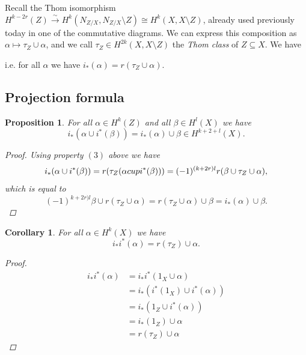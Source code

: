 \documentclass[A4paper, british]{amsart}
\theoremstyle{darkgreentheorem}
\newtheorem{prop}[thm]{Proposition}
\newtheorem{cor}[thm]{Corollary}
\theoremstyle{darkbluedefinition}
\theoremstyle{darkredexample}
\theoremstyle{remark}
\newcommand{\1}{\mathbbm{1}}
\newcommand{\sub}{\subseteq}
\begin{document}
Recall the Thom isomorphism $H^{k-2r}(Z)\xrightarrow{\sim}H^{k}(N_{Z/X},N_{Z/X}\setminus Z)\cong H^{k}(X,X\setminus Z)$, already used previously today in one of the commutative diagrams.
We can express this composition as $\alpha\mapsto \tau_{Z}\cup \alpha$, and we call $\tau_{Z}\in H^{2k}(X,X\setminus Z)$ the \textit{Thom class} of $Z\sub X$.
We have
\begin{center}
\end{center}
i.e. for all $\alpha$ we have $i_{*}(\alpha)=r(\tau_{Z}\cup \alpha)$.

\subsection{Projection formula}

\begin{prop}
    For all $\alpha\in H^{k}(Z)$ and all $\beta\in H^{l}(X)$ we have
    \[ i_{*}(\alpha\cup i^{*}(\beta))=i_{*}(\alpha)\cup \beta \in H^{k+2+l}(X). \]
    \begin{proof}
	Using property $(3)$ above we have
	\[ i_{*}(\alpha\cup i^{*}(\beta))=r(\tau_{Z}(\alpha\\cup i^{*}(\beta)))=(-1)^{(k+2r)l}r(\beta\cup \tau_{Z}\cup \alpha), \]
	which is equal to
	\[ (-1)^{k+2r)l}\beta \cup r(\tau_{Z}\cup \alpha)=r(\tau_{Z}\cup \alpha)\cup \beta=i_{*}(\alpha)\cup \beta. \]
    \end{proof}
\end{prop}

\begin{cor}
    For all $\alpha\in H^{k}(X)$ we have
    \[ i_{*}i^{*}(\alpha)=r(\tau_{Z})\cup \alpha .\] 
    \begin{proof}
	\begin{align*}
	    i_{*}i^{*}(\alpha) & =i_{*}i^{*}(1_{X}\cup \alpha) \\
	     & = i_{*}(i^{*}(1_{X})\cup i^{*}(\alpha)) \\
	     & = i_{*}(1_{Z}\cup i^{*}(\alpha)) \\
	     & = i_{*}(1_{Z})\cup \alpha \\
	     & = r(\tau_{Z})\cup \alpha
	\end{align*}
    \end{proof}
\end{cor}
\end{document}
